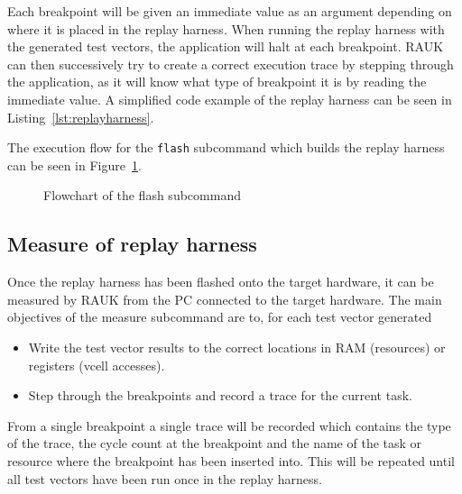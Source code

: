 Each breakpoint will be given an immediate value as an argument depending on
where it is placed in the replay harness. When running the replay harness with
the generated test vectors, the application will halt at each breakpoint. RAUK
can then successively try to create a correct execution trace by stepping
through the application, as it will know what type of breakpoint it is by reading
the immediate value. A simplified code example of the replay harness can be
seen in Listing~\ref{lst:replayharness}.

The execution flow for the \texttt{flash} subcommand which builds the replay
harness can be seen in Figure~\ref{fig:flashcmd}.
\begin{figure}[H]
    \centering
    \caption{Flowchart of the flash subcommand}
    \label{fig:flashcmd}
\end{figure}

\subsection{Measure of replay harness}
Once the replay harness has been flashed onto the target hardware, it can
be measured by RAUK from the PC connected to the target hardware. The main
objectives of the measure subcommand are to, for each test vector generated
\begin{itemize}
    \item Write the test vector results to the correct locations in RAM (resources) or registers (vcell accesses).
   \item Step through the breakpoints and record a trace for the current task.
\end{itemize}
From a single breakpoint a single trace will be recorded which contains the
type of the trace, the cycle count at the breakpoint and the name of the task
or resource where the breakpoint has been inserted into. This will be repeated
until all test vectors have been run once in the replay harness.

